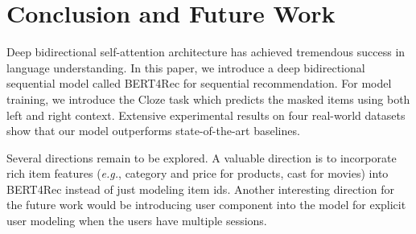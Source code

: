 \section{Conclusion and Future Work}

Deep bidirectional self-attention architecture has achieved tremendous success in language understanding. In this paper, we introduce a deep bidirectional sequential model called BERT4Rec for sequential recommendation. For model training, we introduce the Cloze task which predicts the masked items using both left and right context. Extensive experimental results on four real-world datasets show that our model outperforms state-of-the-art baselines.

Several directions remain to be explored. A valuable direction is to incorporate rich item features (\textit{e.g.}, category and price for products, cast for movies) into BERT4Rec instead of just modeling item ids. Another interesting direction for the future work would be introducing user component into the model for explicit user modeling when the users have multiple sessions.


